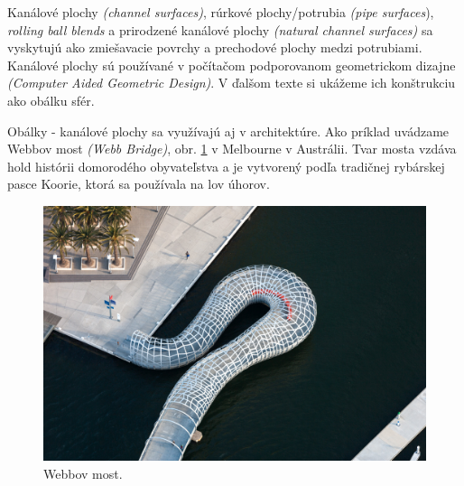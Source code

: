 Kanálové plochy \textit{(channel surfaces)}, rúrkové plochy/potrubia \textit{(pipe surfaces}), \textit{rolling ball blends} a prirodzené kanálové plochy \textit{(natural channel surfaces)} sa vyskytujú ako zmiešavacie povrchy a prechodové plochy medzi potrubiami. Kanálové plochy sú používané v počítačom podporovanom geometrickom dizajne \textit{(Computer Aided Geometric Design)}. V ďalšom texte si ukážeme ich konštrukciu ako obálku sfér.

Obálky - kanálové plochy sa využívajú aj v architektúre. Ako príklad uvádzame Webbov most \textit{(Webb Bridge)}, obr. \ref{fig:webb_bridge} v Melbourne v Austrálii. Tvar mosta vzdáva hold histórii domorodého obyvateľstva a je vytvorený podľa tradičnej rybárskej pasce Koorie, ktorá sa používala na lov úhorov.

\begin{figure}[h!]
	\centering
	\includegraphics[width=\textwidth]{images/webbbridge.jpg}
	\caption[Webbov most.]{Webbov most. \cite{WebbBridge}}
	\label{fig:webb_bridge}
\end{figure}
